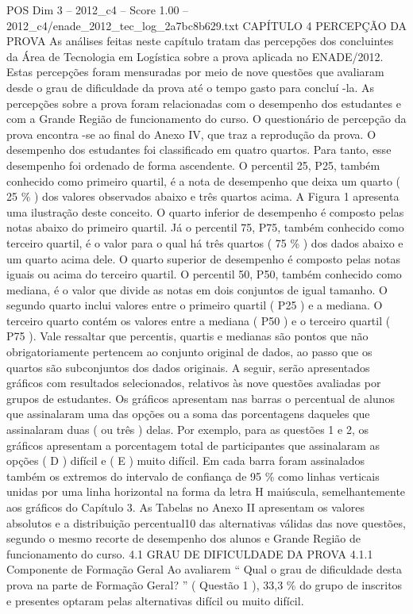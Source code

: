 \begin{textsample}{POS Dim 3 – 2012\_c4 – Score 1.00 – 2012\_c4/enade\_2012\_tec\_log\_2a7bc8b629.txt}  \label{ex:f3_pos_158}
CAPÍTULO 4 PERCEPÇÃO DA PROVA As análises feitas neste capítulo tratam das percepções dos concluintes da Área de Tecnologia em Logística sobre a prova aplicada no ENADE/2012.
Estas percepções foram mensuradas por meio de nove questões que avaliaram desde o grau de dificuldade da prova até o tempo gasto para concluí -la.
As percepções sobre a prova foram relacionadas com o desempenho dos estudantes e com a Grande Região de funcionamento do curso.
O questionário de percepção da prova encontra -se ao final do Anexo IV, que traz a reprodução da prova.
O desempenho dos estudantes foi classificado em quatro quartos.
Para tanto, esse desempenho foi ordenado de forma ascendente.
O percentil 25, P25, também conhecido como primeiro quartil, é a nota de desempenho que deixa um quarto ( 25 \% ) dos valores observados abaixo e três quartos acima.
A Figura 1 apresenta uma ilustração deste conceito.
O quarto inferior de desempenho é composto pelas notas abaixo do primeiro quartil.
Já o percentil 75, P75, também conhecido como terceiro quartil, é o valor para o qual há três quartos ( 75 \% ) dos dados abaixo e um quarto acima dele.
O quarto superior de desempenho é composto pelas notas iguais ou acima do terceiro quartil.
O percentil 50, P50, também conhecido como mediana, é o valor que divide as notas em dois conjuntos de igual tamanho.
O segundo quarto inclui valores entre o primeiro quartil ( P25 ) e a mediana.
O terceiro quarto contém os valores entre a mediana ( P50 ) e o terceiro quartil ( P75 ).
Vale ressaltar que percentis, quartis e medianas são pontos que não obrigatoriamente pertencem ao conjunto original de dados, ao passo que os quartos são subconjuntos dos dados originais.
A seguir, serão apresentados gráficos com resultados selecionados, relativos às nove questões avaliadas por grupos de estudantes.
Os gráficos apresentam nas barras o percentual de alunos que assinalaram uma das opções ou a soma das porcentagens daqueles que assinalaram duas ( ou três ) delas.
Por exemplo, para as questões 1 e 2, os gráficos apresentam a porcentagem total de participantes que assinalaram as opções ( D ) difícil e ( E ) muito difícil.
Em cada barra foram assinalados também os extremos do intervalo de confiança de 95 \% como linhas verticais unidas por uma linha horizontal na forma da letra H maiúscula, semelhantemente aos gráficos do Capítulo 3.
As Tabelas no Anexo II apresentam os valores absolutos e a distribuição percentual10 das alternativas válidas das nove questões, segundo o mesmo recorte de desempenho dos alunos e Grande Região de funcionamento do curso. 4.1 GRAU DE DIFICULDADE DA PROVA 4.1.1 Componente de Formação Geral Ao avaliarem “ Qual o grau de dificuldade desta prova na parte de Formação Geral? ” ( Questão 1 ), 33,3 \% do grupo de inscritos e presentes optaram pelas alternativas difícil ou muito difícil.

\end{textsample}
